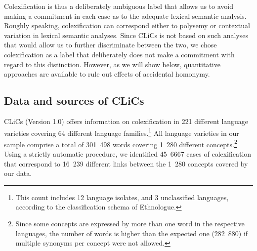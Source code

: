 Colexification is thus a deliberately ambiguous label that allows us to avoid making a commitment in
each case as to the adequate lexical semantic analysis.
Roughly speaking,
colexification can correspond either to polysemy or contextual variation in lexical semantic analyses.
Since CLiCs is not based on such analyses that would allow us to further discriminate between the
two, we chose colexification as a label that deliberately does not make a commitment with regard to
this distinction. However, as we will show below, quantitative approaches are available to rule out effects of accidental homonymy. 

\subsection{Data and sources of CLiCs}
CLiCs (Version 1.0) offers information on colexification in 221 different language varieties
covering 64 different language families.\footnote{This count includes 12 language isolates, and 3
unclassified languages, according to the classification schema of Ethnologue.} All language varieties in our sample comprise a total of
301~498 words covering 1~280 different concepts.\footnote{Since some concepts are expressed by more
than one word in the respective languages, the number of words is higher than the expected one
(282~880) if
multiple synonyms per concept were not allowed.} Using a strictly automatic procedure, we identified
45~6667 cases of colexification that correspond to 16~239 different links between the 1~280 concepts
covered by our data. 

